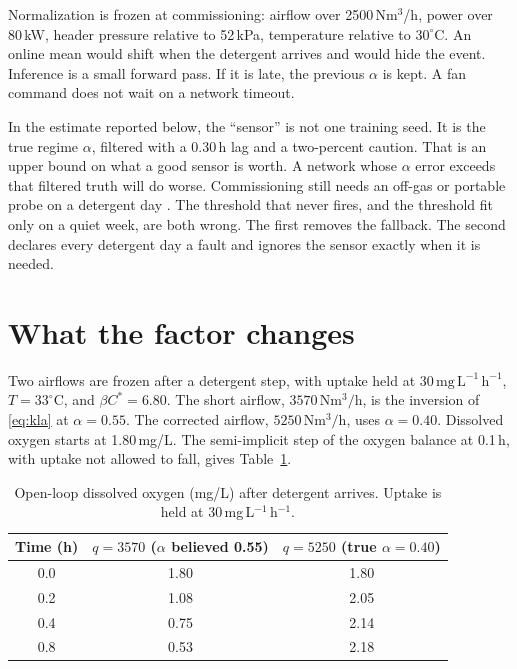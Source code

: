 \documentclass[11pt,a4paper]{article}
\begin{document}
Normalization is frozen at commissioning: airflow over 2500\,Nm\(^{3}\)/h, power over 80\,kW, header pressure relative to 52\,kPa, temperature relative to \(30^{\circ}\mathrm{C}\). An online mean would shift when the detergent arrives and would hide the event. Inference is a small forward pass. If it is late, the previous \(\alpha\) is kept. A fan command does not wait on a network timeout.

In the estimate reported below, the ``sensor'' is not one training seed. It is the true regime \(\alpha\), filtered with a 0.30\,h lag and a two-percent caution. That is an upper bound on what a good sensor is worth. A network whose \(\alpha\) error exceeds that filtered truth will do worse. Commissioning still needs an off-gas or portable probe on a detergent day \cite{leu2009,asce2007}. The threshold that never fires, and the threshold fit only on a quiet week, are both wrong. The first removes the fallback. The second declares every detergent day a fault and ignores the sensor exactly when it is needed.

\section{What the factor changes}

Two airflows are frozen after a detergent step, with uptake held at \(30\,\mathrm{mg\,L^{-1}\,h^{-1}}\), \(T=33^{\circ}\mathrm{C}\), and \(\beta C^{*}=6.80\). The short airflow, \(3570\,\mathrm{Nm^{3}/h}\), is the inversion of \eqref{eq:kla} at \(\alpha=0.55\). The corrected airflow, \(5250\,\mathrm{Nm^{3}/h}\), uses \(\alpha=0.40\). Dissolved oxygen starts at 1.80\,mg/L. The semi-implicit step of the oxygen balance at 0.1\,h, with uptake not allowed to fall, gives Table~\ref{tab:ol}.

\begin{table}[ht]
\centering
\caption{Open-loop dissolved oxygen (mg/L) after detergent arrives. Uptake is held at 30\,mg\,L\(^{-1}\)\,h\(^{-1}\).}
\label{tab:ol}
\small
\begin{tabular}{@{}ccc@{}}
\toprule
Time (h) & \(q=3570\) (\(\alpha\) believed 0.55) & \(q=5250\) (true \(\alpha=0.40\)) \\
\midrule
0.0 & 1.80 & 1.80 \\
0.2 & 1.08 & 2.05 \\
0.4 & 0.75 & 2.14 \\
0.8 & 0.53 & 2.18 \\
\bottomrule
\end{tabular}
\end{table}
\end{document}
